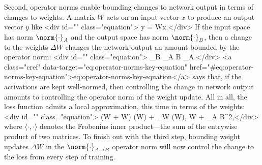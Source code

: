 Second, operator norms enable bounding changes to network output in terms of changes to weights. A matrix $W$ acts on an input vector $x$ to produce an output vector $y$ like <div id="" class="equation">    y = Wx.</div> If the input space has norm $\norm{\cdot}_A$ and the output space has norm $\norm{\cdot}_B$, then a change to the weights $\Delta W$ changes the network output an amount bounded by the operator norm: <div id="" class="equation">    \label{eq:operator-norms-key-equation}
    _B \leq {}_{A \to B} _A.</div> <a class="cref" data-target="eq:operator-norms-key-equation" href="#eq:operator-norms-key-equation">eq:operator-norms-key-equation</a> says that, if the activations are kept well-normed, then controlling the change in network output amounts to controlling the operator norm of the weight update. All in all, the loss function admits a local approximation, this time in terms of the weights: <div id="" class="equation">    \label{eq:steepest-descent-loss}
    \el(W + \Delta W) \approx \el(W) + \langle \nabla_W \el(W), \Delta W \rangle + \cdot {}_{A \to B}^2,</div> where $\langle \cdot, \cdot \rangle$ denotes the Frobenius inner product---the sum of the entrywise product of two matrices. To finish out with the third step, bounding weight updates $\Delta W$ in the $\norm{\cdot}_{A \to B}$ operator norm will now control the change to the loss from every step of training.


